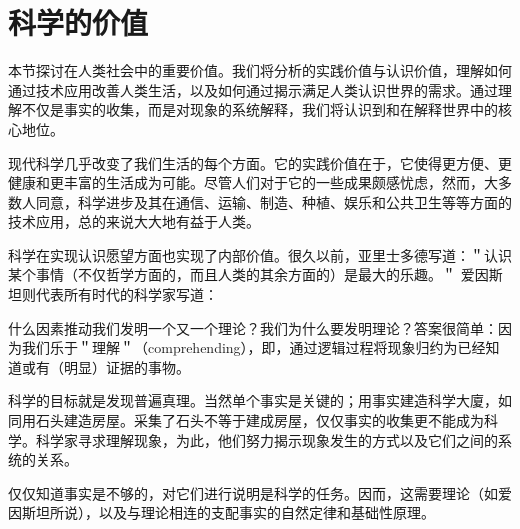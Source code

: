 \section{科学的价值}

\begin{logicbox}[title=引言]
本节探讨在人类社会中的重要价值。我们将分析的实践价值与认识价值，理解如何通过技术应用改善人类生活，以及如何通过揭示满足人类认识世界的需求。通过理解不仅是事实的收集，而是对现象的系统解释，我们将认识到和在解释世界中的核心地位。
\end{logicbox}

现代科学几乎改变了我们生活的每个方面。它的实践价值在于，它使得更方便、更健康和更丰富的生活成为可能。尽管人们对于它的一些成果颇感忧虑，然而，大多数人同意，科学进步及其在通信、运输、制造、种植、娱乐和公共卫生等等方面的技术应用，总的来说大大地有益于人类。

科学在实现认识愿望方面也实现了内部价值。很久以前，亚里士多德写道：＂认识某个事情（不仅哲学方面的，而且人类的其余方面的）是最大的乐趣。＂\cite{aristotle1950} 爱因斯坦则代表所有时代的科学家写道：

\begin{displayquote}
什么因素推动我们发明一个又一个理论？我们为什么要发明理论？答案很简单：因为我们乐于＂理解＂（comprehending），即，通过逻辑过程将现象归约为已经知道或有（明显）证据的事物。\cite{einstein1935}
\end{displayquote}

科学的目标就是发现普遍真理。当然单个事实是关键的；用事实建造科学大廈，如同用石头建造房屋。采集了石头不等于建成房屋，仅仅事实的收集更不能成为科学。科学家寻求理解现象，为此，他们努力揭示现象发生的方式以及它们之间的系统的关系。

仅仅知道事实是不够的，对它们进行说明是科学的任务。因而，这需要理论（如爱因斯坦所说），以及与理论相连的支配事实的自然定律和基础性原理。

